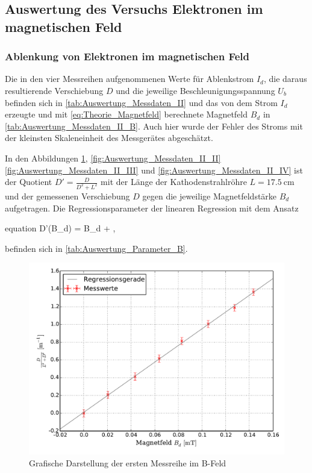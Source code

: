 \subsection{Auswertung des Versuchs Elektronen im magnetischen Feld}

	\subsubsection{Ablenkung von Elektronen im magnetischen Feld}
	
		Die in den vier Messreihen aufgenommenen Werte für Ablenkstrom $I_{d}$,
		die daraus resultierende Verschiebung $D$ und die jeweilige 
		Beschleunigungsspannung $U_{b}$ befinden sich in 
		\cref{tab:Auswertung_Messdaten_II} und das von dem Strom $I_{d}$ 
		erzeugte und mit \cref{eq:Theorie_Magnetfeld} berechnete Magnetfeld $B_{d}$ in 
		\cref{tab:Auswertung_Messdaten_II_B}. Auch hier wurde der Fehler des Stroms 
		mit der kleinsten Skaleneinheit des Messgerätes abgeschätzt.
		
		
		
		
		In den Abbildungen \ref{fig:Auswertung_Messdaten_II_I}, \ref{fig:Auswertung_Messdaten_II_II}
		\ref{fig:Auswertung_Messdaten_II_III} und \ref{fig:Auswertung_Messdaten_II_IV}
		ist der Quotient $D'=\frac{D}{D^{2} + L^{2}}$ mit der Länge der Kathodenstrahlröhre 
		$L = \SI{17.5}{\centi\meter}$ und der gemessenen Verschiebung $D$ gegen die
		jeweilige Magnetfeldstärke $B_{d}$ aufgetragen.
		Die Regressionsparameter der linearen Regression mit dem Ansatz
		\begin{empheq}{equation}
			D'(B_{d}) = \gamma \cdot B_{d} + \delta,
		\end{empheq} 
		befinden sich in \cref{tab:Auswertung_Parameter_B}.
		
		
		
		\begin{figure}[!h]
		\centering
				\includegraphics[scale=0.7]{Grafiken/BFeld_Messreihe_I.pdf}
				\caption{Grafische Darstellung der ersten Messreihe im B-Feld}\label{fig:Auswertung_Messdaten_II_I}
		\end{figure}
		
